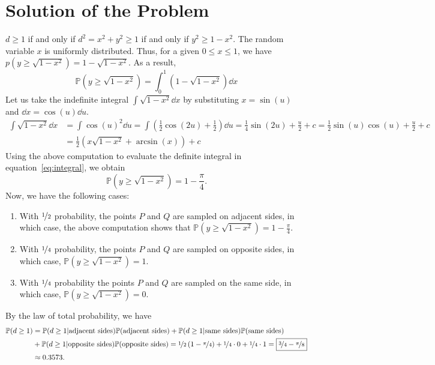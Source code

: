 \section{Solution of the Problem}
\label{sec:solution}

$d \geq 1$ if and only if $d^2 = x^2 + y^2 \geq 1$ if and only if $y^2 \geq 1 -
x^2$. The random variable $x$ is uniformly distributed. Thus, for a given $0
\leq x \leq 1$, we have $p(y \geq \sqrt{1-x^2}) = 1- \sqrt{1 - x^2}$. As a
result,
\begin{equation}
    \mathbb{P}(y \geq \sqrt{1-x^2}) = \int_0^1 \left(1 - \sqrt{1-x^2} \right)
    \dd x
    \label{eq:integral}
\end{equation}
%
Let us take the indefinite integral $\int \sqrt{1-x^2} \dd x$ by substituting $x
= \sin{(u)}$ and $\dd x = \cos{(u)} \dd u$.
\begin{align*}
    \int \sqrt{1-x^2} \dd x &= \int \cos{(u)}^2 \dd u = \int \left(
    \frac{1}{2}\cos{(2u)} + \frac{1}{2} \right) \dd u = \frac{1}{4}\sin{(2u)} +
    \frac{u}{2} + c = \frac{1}{2}\sin{(u)}\cos{(u)} + \frac{u}{2} + c \\
    &= \frac{1}{2}\left( x\sqrt{1-x^2} + \arcsin{(x)}\right) + c
\end{align*}
%
Using the above computation to evaluate the definite integral in
equation~\eqref{eq:integral}, we obtain
\[ \mathbb{P}(y \geq \sqrt{1-x^2}) = 1 - \frac{\pi}{4}. \]
%
Now, we have the following cases:
%
\begin{enumerate}
    \item With $\nicefrac{1}{2}$ probability, the points $P$ and $Q$ are sampled
        on adjacent sides, in which case, the above computation shows that
        $\mathbb{P}(y \geq \sqrt{1-x^2}) = 1 - \frac{\pi}{4}$.
    \item With $\nicefrac{1}{4}$ probability, the points $P$ and $Q$ are sampled
        on opposite sides, in which case, $\mathbb{P}(y \geq \sqrt{1-x^2}) = 1$.
    \item With $\nicefrac{1}{4}$ probability the points $P$ and $Q$ are sampled
        on the same side, in which case, $\mathbb{P}(y \geq \sqrt{1-x^2}) = 0$.
\end{enumerate}
%
By the law of total probability, we have 
\begin{align*}
    \mathbb{P}(d \geq 1) &= \mathbb{P}(d \geq 1 | \text{adjacent
    sides})\mathbb{P}(\text{adjacent sides}) + \mathbb{P}(d \geq 1 | \text{same
    sides})\mathbb{P}(\text{same sides}) \\
     &+ \mathbb{P}(d \geq 1 | \text{opposite sides})\mathbb{P}(\text{opposite
     sides}) = \nicefrac{1}{2}\left(1 - \nicefrac{\pi}{4}\right) +
     \nicefrac{1}{4}\cdot 0 + \nicefrac{1}{4}\cdot 1 = \boxed{\nicefrac{3}{4} -
     \nicefrac{\pi}{8}} \\
     &\approx 0.3573.
\end{align*}
